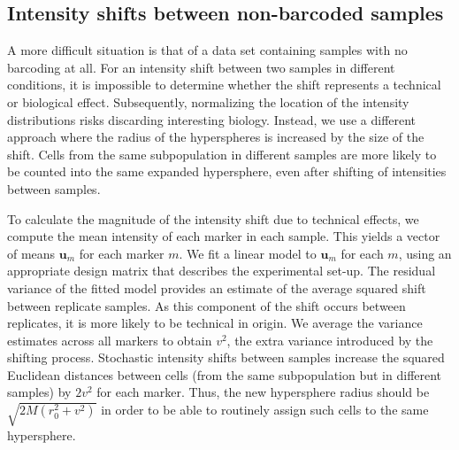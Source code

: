 \documentclass{article}
\begin{document}
\subsection{Intensity shifts between non-barcoded samples}
\label{sec:techshift}
A more difficult situation is that of a data set containing samples with no barcoding at all.
For an intensity shift between two samples in different conditions, it is impossible to determine whether the shift represents a technical or biological effect.
Subsequently, normalizing the location of the intensity distributions risks discarding interesting biology.
Instead, we use a different approach where the radius of the hyperspheres is increased by the size of the shift.
Cells from the same subpopulation in different samples are more likely to be counted into the same expanded hypersphere, even after shifting of intensities between samples.

To calculate the magnitude of the intensity shift due to technical effects, we compute the mean intensity of each marker in each sample.
This yields a vector of means $\mathbf{u}_m$ for each marker $m$.
We fit a linear model to $\mathbf{u}_m$ for each $m$, using an appropriate design matrix that describes the experimental set-up.
The residual variance of the fitted model provides an estimate of the average squared shift between replicate samples.
As this component of the shift occurs between replicates, it is more likely to be technical in origin.
We average the variance estimates across all markers to obtain $v^2$, the extra variance introduced by the shifting process.
Stochastic intensity shifts between samples increase the squared Euclidean distances between cells (from the same subpopulation but in different samples) by $2v^2$ for each marker.
Thus, the new hypersphere radius should be $\sqrt{2M(r_0^2 + v^2)}$ in order to be able to routinely assign such cells to the same hypersphere.

\end{document}
